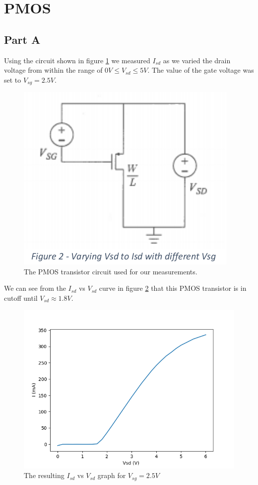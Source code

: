 \section{PMOS}
\subsection{Part A}
Using the circuit shown in figure \ref{fig:pmos_circuit} we measured $I_{sd}$ as we varied the drain voltage from within the range of $0 V \le V_{sd} \le 5 V$. 
The value of the gate voltage was set to $V_{sg} = 2.5V$. 
\\

\FloatBarrier

\begin{figure}[h!]
	\centering
	\includegraphics[scale=0.75]{../images/pmos_circuit}
	\caption{The PMOS transistor circuit used for our measurements.}
	\label{fig:pmos_circuit}
\end{figure}

\FloatBarrier
We can see from the $I_{sd}$ vs $V_{sd}$ curve in figure \ref{fig:pmos} that this PMOS transistor is in cutoff until $V_{sd} \approx 1.8 V$. 

\FloatBarrier

\begin{figure}[h!]
	\centering
	\includegraphics[scale=0.75]{../data/pmos.png}
	\caption{The resulting $I_{sd}$ vs $V_{sd}$ graph for $V_{sg}=2.5V$}
	\label{fig:pmos}
\end{figure}

